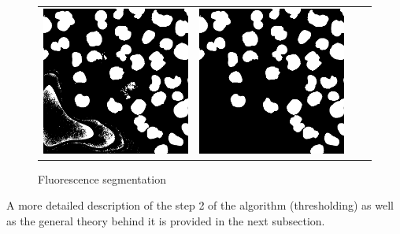\begin{figure}[htb]
\begin{tabularx}{\textwidth}{YYYY}
            \includegraphics{bilder/segmentation/nuclei-mask/filled_holes.png} & 
            \includegraphics{bilder/segmentation/nuclei-mask/mask.png}
        \end{tabularx}
    \caption{Fluorescence segmentation}
    \label{fig:segmentation-nuclei-steps}
\end{figure}

A more detailed description of the step 2 of the algorithm (thresholding) as well as the general theory behind it is provided in the next subsection.